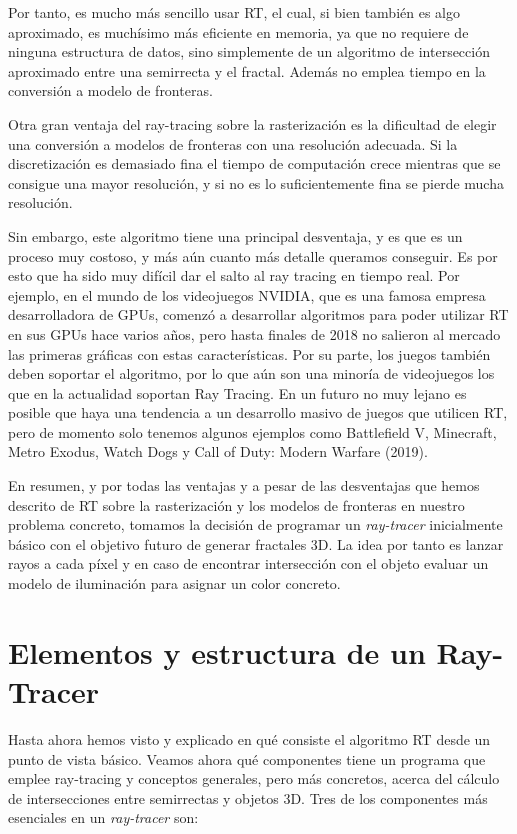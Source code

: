 Por tanto, es mucho más sencillo usar RT, el cual, si bien también es algo aproximado, es muchísimo más eficiente en memoria, ya que no requiere de ninguna estructura de datos, sino simplemente de un algoritmo de intersección aproximado entre una semirrecta y el fractal. Además no emplea tiempo en la conversión a modelo de fronteras. 

Otra gran ventaja del ray-tracing sobre la rasterización es la dificultad de elegir una conversión a modelos de fronteras con una resolución adecuada. Si la discretización es demasiado fina el tiempo de computación crece mientras que se consigue una mayor resolución, y si no es lo suficientemente fina se pierde mucha resolución.

Sin embargo, este algoritmo tiene una principal desventaja, y es que es un proceso muy costoso, y más aún cuanto más detalle queramos conseguir. Es por esto que ha sido muy difícil dar el salto al ray tracing en tiempo real. Por ejemplo, en el mundo de los videojuegos NVIDIA, que es una famosa empresa desarrolladora de GPUs, comenzó a desarrollar algoritmos para poder utilizar RT en sus GPUs hace varios años, pero hasta finales de 2018 no salieron al mercado las primeras gráficas con estas características. Por su parte, los juegos también deben soportar el algoritmo, por lo que aún son una minoría de videojuegos los que en la actualidad soportan Ray Tracing. En un futuro no muy lejano es posible que haya una tendencia a un desarrollo masivo de juegos que utilicen RT, pero de momento solo tenemos algunos ejemplos como Battlefield V, Minecraft, Metro Exodus, Watch Dogs y Call of Duty: Modern Warfare (2019).

En resumen, y por todas las ventajas y a pesar de las desventajas que hemos descrito de RT sobre la rasterización y los modelos de fronteras en nuestro problema concreto, tomamos la decisión de programar un \textit{ray-tracer} inicialmente básico con el objetivo futuro de generar fractales 3D. La idea por tanto es lanzar rayos a cada píxel y en caso de encontrar intersección con el objeto evaluar un modelo de iluminación para asignar un color concreto.

\section{Elementos y estructura de un Ray-Tracer}
\label{section:elementos-RT}

Hasta ahora hemos visto y explicado en qué consiste el algoritmo RT desde un punto de vista básico. Veamos ahora qué componentes tiene un programa que emplee ray-tracing y conceptos generales, pero más concretos, acerca del cálculo de intersecciones entre semirrectas y objetos 3D. Tres de los componentes más esenciales en un \textit{ray-tracer} son:

